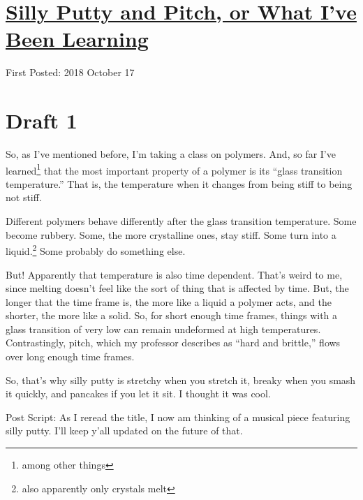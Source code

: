 \documentclass[12pt]{article}[titlepage]
\newcommand{\say}[1]{``#1''}
\newcommand{\1}{\={a}}
\newcommand{\2}{\={e}}
\newcommand{\3}{\={\i}}
\newcommand{\4}{\=o}
\newcommand{\5}{\=u}
\newcommand{\6}{\={A}}
\renewcommand{\,}{\textsuperscript{,}}
\begin{document}
\doublespacing
\section{\href{silly-putty-and-pitch.html}{Silly Putty and Pitch, or What I've Been Learning}}
First Posted: 2018 October 17
\section{Draft 1}
So, as I've mentioned before, I'm taking a class on polymers.
And, so far I've learned\footnote{among other things} that the most important property of a polymer is its \say{glass transition temperature.}
That is, the temperature when it changes from being stiff to being not stiff.

Different polymers behave differently after the glass transition temperature.
Some become rubbery.
Some, the more crystalline ones, stay stiff.
Some turn into a liquid.\footnote{also apparently only crystals melt}
Some probably do something else.

But!
Apparently that temperature is also time dependent.
That's weird to me, since melting doesn't feel like the sort of thing that is affected by time.
But, the longer that the time frame is, the more like a liquid a polymer acts, and the shorter, the more like a solid.
So, for short enough time frames, things with a glass transition of very low can remain undeformed at high temperatures.
Contrastingly, pitch, which my professor describes as \say{hard and brittle,} flows over long enough time frames.

So, that's why silly putty is stretchy when you stretch it, breaky when you smash it quickly, and pancakes if you let it sit.
I thought it was cool.

Post Script: As I reread the title, I now am thinking of a musical piece featuring silly putty.
I'll keep y'all updated on the future of that.
\end{document}

